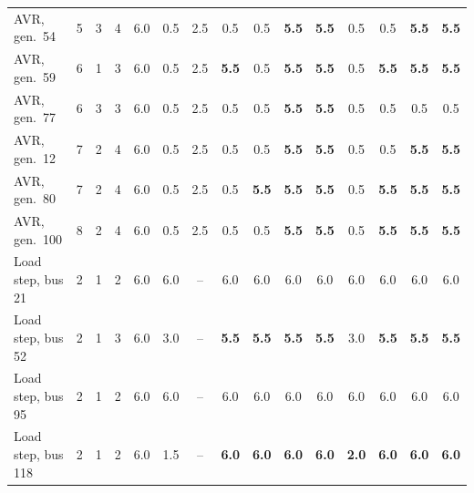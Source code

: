 \begin{table}[t]
\begin{tabular}{@{}lcccccccccccccc@{}}
AVR, gen.\ 54 & 5 & 3 & 4 & 6.0 & 0.5 & 2.5 & 0.5 & 0.5 & \textbf{5.5} & \textbf{5.5} & 0.5 & 0.5 & \textbf{5.5} & \textbf{5.5} \\
AVR, gen.\ 59 & 6 & 1 & 3 & 6.0 & 0.5 & 2.5 & \textbf{5.5} & 0.5 & \textbf{5.5} & \textbf{5.5} & 0.5 & \textbf{5.5} & \textbf{5.5} & \textbf{5.5} \\
AVR, gen.\ 77 & 6 & 3 & 3 & 6.0 & 0.5 & 2.5 & 0.5 & 0.5 & \textbf{5.5} & \textbf{5.5} & 0.5 & 0.5 & 0.5 & 0.5 \\
AVR, gen.\ 12 & 7 & 2 & 4 & 6.0 & 0.5 & 2.5 & 0.5 & 0.5 & \textbf{5.5} & \textbf{5.5} & 0.5 & 0.5 & \textbf{5.5} & \textbf{5.5} \\
AVR, gen.\ 80 & 7 & 2 & 4 & 6.0 & 0.5 & 2.5 & 0.5 & \textbf{5.5} & \textbf{5.5} & \textbf{5.5} & 0.5 & \textbf{5.5} & \textbf{5.5} & \textbf{5.5} \\
AVR, gen.\ 100 & 8 & 2 & 4 & 6.0 & 0.5 & 2.5 & 0.5 & 0.5 & \textbf{5.5} & \textbf{5.5} & 0.5 & \textbf{5.5} & \textbf{5.5} & \textbf{5.5} \\
Load step, bus 21 & 2 & 1 & 2 & 6.0 & 6.0 & -- & 6.0 & 6.0 & 6.0 & 6.0 & 6.0 & 6.0 & 6.0 & 6.0 \\
Load step, bus 52 & 2 & 1 & 3 & 6.0 & 3.0 & -- & \textbf{5.5} & \textbf{5.5} & \textbf{5.5} & \textbf{5.5} & 3.0 & \textbf{5.5} & \textbf{5.5} & \textbf{5.5} \\
Load step, bus 95 & 2 & 1 & 2 & 6.0 & 6.0 & -- & 6.0 & 6.0 & 6.0 & 6.0 & 6.0 & 6.0 & 6.0 & 6.0 \\
Load step, bus 118 & 2 & 1 & 2 & 6.0 & 1.5 & -- & \textbf{6.0} & \textbf{6.0} & \textbf{6.0} & \textbf{6.0} & \textbf{2.0} & \textbf{6.0} & \textbf{6.0} & \textbf{6.0} \\
\bottomrule
\end{tabular}
\end{table}
